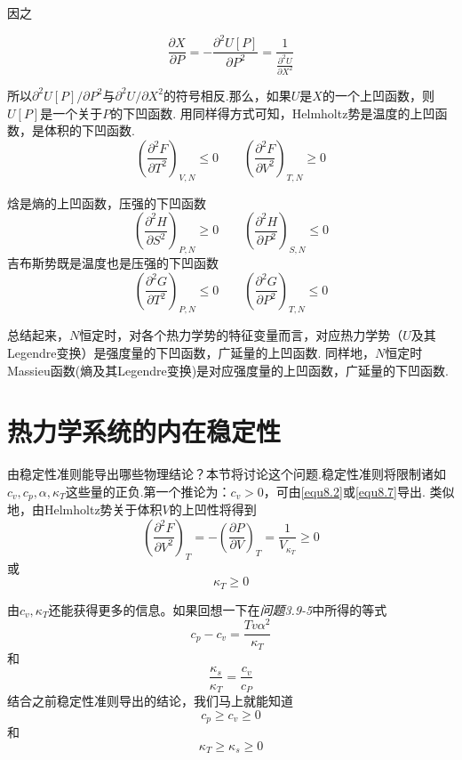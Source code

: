 因之

\begin{equation}
\label{equ8.12}
\frac{\partial X}{\partial P}=-\frac{\partial^2U[P]}{\partial　P^2}=\dfrac{1}{\frac{\partial^2U}{\partial X^2}}
\end{equation}

所以$\partial^2U[P]/\partial P^2$与$\partial^2U/\partial X^2$的符号相反.那么，如果$U$是$X$的一个上凹函数，则$U[P]$是一个关于$P$的下凹函数. 用同样得方式可知，Helmholtz势是温度的上凹函数，是体积的下凹函数.
\begin{equation}
\label{equ8.13}
\left(\frac{\partial^2 F}{\partial T^2}\right)_{V,N}\leq 0\qquad \left(\frac{\partial^2 F}{\partial V^2}\right)_{T,N}\geq 0
\end{equation}

焓是熵的上凹函数，压强的下凹函数
\begin{equation}
\label{equ8.14}
\left(\frac{\partial^2 H}{\partial S^2}\right)_{P,N}\geq 0\qquad \left(\frac{\partial^2 H}{\partial P^2}\right)_{S,N}\leq 0
\end{equation}
吉布斯势既是温度也是压强的下凹函数
\begin{equation}
\label{equ8.15}
\left(\frac{\partial^2 G}{\partial T^2}\right)_{P,N}\leq 0\qquad \left(\frac{\partial^2 G}{\partial P^2}\right)_{T,N}\leq 0
\end{equation}

总结起来，$N$恒定时，对各个热力学势的特征变量而言，对应热力学势（$U$及其Legendre变换）是强度量的下凹函数，广延量的上凹函数. 同样地，$N$恒定时Massieu函数(熵及其Legendre变换)是对应强度量的上凹函数，广延量的下凹函数.

\section{热力学系统的内在稳定性}
\label{sec8.3}
由稳定性准则能导出哪些物理结论？本节将讨论这个问题.稳定性准则将限制诸如$c_v, c_p,\alpha,\kappa_T$这些量的正负.第一个推论为：$c_v>0$，可由\ref{equ8.2}或\ref{equ8.7}导出. 类似地，由Helmholtz势关于体积$V$的上凹性将得到
\begin{equation}
\label{equ8.16}
\left(\frac{\partial^2F}{\partial V^2}\right)_T=-\left(\frac{\partial P}{\partial V}\right)_T=\frac{1}{V_{\kappa_T}}\ge 0
\end{equation}
或
\begin{equation}
\label{equ8.17}
\kappa_T\ge 0
\end{equation}

由$c_v, \kappa_T$还能获得更多的信息。如果回想一下在\textsl{问题3.9-5}中所得的等式
\begin{equation}
\label{equ8.18}
c_p-c_v=\frac{Tv\alpha^2}{\kappa_T}
\end{equation}
和
\begin{equation}
\frac{\kappa_s}{\kappa_T}=\frac{c_v}{c_P}
\end{equation}
结合之前稳定性准则导出的结论，我们马上就能知道
\begin{equation}
c_p\ge c_v\ge 0
\end{equation}
和
\begin{equation}
\kappa_T\ge\kappa_s\ge 0
\end{equation}

